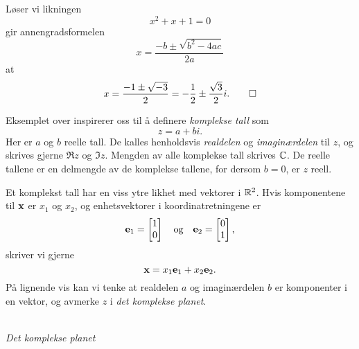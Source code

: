 \begin{ex}
Løser vi likningen
\[
x^2+x+1=0
\]
gir annengradsformelen
\[
x=\frac{-b\pm\sqrt{b^2-4ac}}{2a}
\]
at
\[
x=\frac{-1\pm\sqrt{-3}}{2}=-\frac{1}{2}\pm\frac{\sqrt{3}}{2}i. \qedhere
\]
\end{ex}

Eksemplet over inspirerer oss til å definere \emph{komplekse tall} som 
\[
z=a+bi.
\]
Her er $a$ og $b$ reelle tall. 
De kalles henholdsvis \emph{realdelen} og \emph{imaginærdelen} til $z$,
og skrives gjerne $\Re z$ og $\Im z$. 
Mengden av alle komplekse tall skrives $\mathbb{C}$. 
De reelle tallene er en delmengde av de komplekse tallene,%
for dersom $b=0$, er $z$ reell. 

Et komplekst tall har en viss ytre likhet med vektorer i $\mathbb{R}^2$. 
Hvis komponentene til $\mathbf{x}$ er $x_1$ og $x_2$, og enhetsvektorer i koordinatretningene er 
\[
\mathbf{e}_1=\begin{bmatrix} 1 \\ 0 \end{bmatrix} \quad \text{og} \quad \mathbf{e}_2=\begin{bmatrix} 0 \\ 1 \end{bmatrix}, 
\]
skriver vi gjerne
\[
\mathbf{x}=x_1 \mathbf{e}_1+x_2 \mathbf{e}_2.
\]
På lignende vis kan vi tenke at realdelen $a$ og imaginærdelen $b$ er komponenter i en vektor,
og avmerke $z$ i \emph{det komplekse planet}. 
\begin{center}
\\
{\small \textit{Det komplekse planet}}
\end{center}



